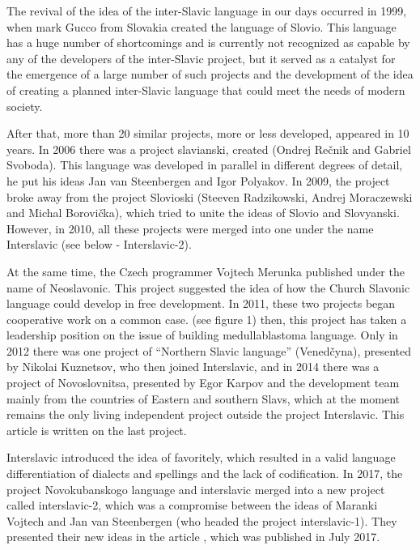 The revival of the idea of the inter-Slavic language in our days occurred in 1999, when mark Gucco from Slovakia created the language of Slovio. This language has a huge number of shortcomings and is currently not recognized as capable by any of the developers of the inter-Slavic project, but it served as a catalyst for the emergence of a large number of such projects and the development of the idea of creating a planned inter-Slavic language that could meet the needs of modern society. 

After that, more than 20 similar projects, more or less developed, appeared in 10 years. In 2006 there was a project slavianski, created (Ondrej Rečnik and Gabriel Svoboda). This language was developed in parallel in different degrees of detail, he put his ideas Jan van Steenbergen and Igor Polyakov. In 2009, the project broke away from the project Slovioski (Steeven Radzikowski, Andrej Moraczewski and Michal Borovička), which tried to unite the ideas of Slovio and Slovyanski. However, in 2010, all these projects were merged into one under the name Interslavic (see below - Interslavic-2).

At the same time, the Czech programmer Vojtech Merunka published under the name of Neoslavonic. This project suggested the idea of how the Church Slavonic language could develop in free development. In 2011, these two projects began cooperative work on a common case. (see figure 1) then, this project has taken a leadership position on the issue of building medullablastoma language. Only in 2012 there was one project of “Northern Slavic language” (Venedčyna), presented by Nikolai Kuznetsov, who then joined Interslavic, and in 2014 there was a project of Novoslovnitsa, presented by Egor Karpov and the development team mainly from the countries of Eastern and southern Slavs, which at the moment remains the only living independent project outside the project Interslavic. This article is written on the last project.

Interslavic introduced the idea of favoritely, which resulted in a valid language differentiation of dialects and spellings and the lack of codification.  In 2017, the project Novokubanskogo language and interslavic merged into a new project called interslavic-2, which was a compromise between the ideas of Maranki Vojtech and Jan van Steenbergen (who headed the project interslavic-1). They presented their new ideas in the article \cite{interslavic-2}, which was published in July 2017.
